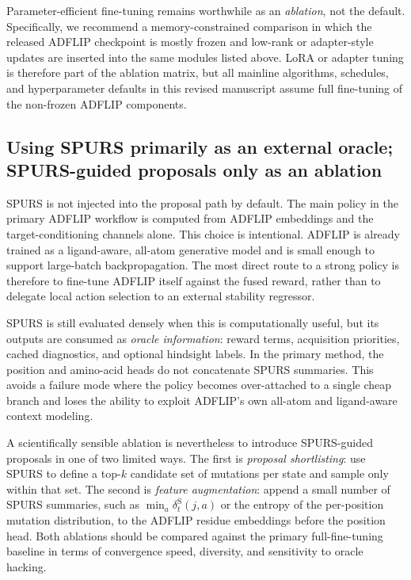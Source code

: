 \documentclass[11pt]{article}
\begin{document}
	Parameter-efficient fine-tuning remains worthwhile as an \emph{ablation}, not the default. Specifically, we recommend a memory-constrained comparison in which the released ADFLIP checkpoint is mostly frozen and low-rank or adapter-style updates are inserted into the same modules listed above. LoRA or adapter tuning is therefore part of the ablation matrix, but all mainline algorithms, schedules, and hyperparameter defaults in this revised manuscript assume full fine-tuning of the non-frozen ADFLIP components.
	
	
	
	\subsection{Using SPURS primarily as an external oracle; SPURS-guided proposals only as an ablation}
	
	SPURS is not injected into the proposal path by default. The main policy in the primary ADFLIP workflow is computed from ADFLIP embeddings and the target-conditioning channels alone. This choice is intentional. ADFLIP is already trained as a ligand-aware, all-atom generative model and is small enough to support large-batch backpropagation. The most direct route to a strong policy is therefore to fine-tune ADFLIP itself against the fused reward, rather than to delegate local action selection to an external stability regressor.
	
	SPURS is still evaluated densely when this is computationally useful, but its outputs are consumed as \emph{oracle information}: reward terms, acquisition priorities, cached diagnostics, and optional hindsight labels. In the primary method, the position and amino-acid heads do not concatenate SPURS summaries. This avoids a failure mode where the policy becomes over-attached to a single cheap branch and loses the ability to exploit ADFLIP's own all-atom and ligand-aware context modeling.
	
	A scientifically sensible ablation is nevertheless to introduce SPURS-guided proposals in one of two limited ways. The first is \emph{proposal shortlisting}: use SPURS to define a top-$k$ candidate set of mutations per state and sample only within that set. The second is \emph{feature augmentation}: append a small number of SPURS summaries, such as $\min_a \delta_t^{\mathrm S}(j,a)$ or the entropy of the per-position mutation distribution, to the ADFLIP residue embeddings before the position head. Both ablations should be compared against the primary full-fine-tuning baseline in terms of convergence speed, diversity, and sensitivity to oracle hacking.
	
\end{document}
